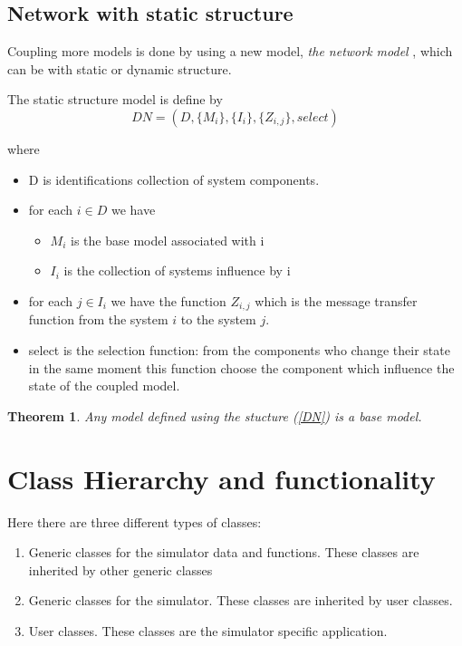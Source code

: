 \documentclass[a4paper,oneside,notitlepage]{article}
\newtheorem{theorem}{Theorem}
\begin{document}
\subsection{Network with static structure}

Coupling more models is done by using a new model, \textit{the network model}%
, which can be with static or dynamic structure.

The static structure model is define by%
\begin{equation}
DN=(D,\{M_{i}\},\{I_{i}\},\{Z_{i,j}\},select)  \label{DN}
\end{equation}

where

\begin{itemize}
\item D is identifications collection of system components.

\item for each $i\in D$ we have

\begin{itemize}
\item $M_{i}$ is the base model associated with i

\item $I_{i}$ is the collection of systems influence by i
\end{itemize}

\item for each $j\in I_{i}$ we have the function $Z_{i,j}$ which is the
message transfer function from the system \thinspace $i$ to the system $j$.

\item select is the selection function: from the components who change their
state in the same moment this function choose the component which influence
the state of the coupled model.
\end{itemize}

\begin{theorem}
Any model defined using the stucture (\ref{DN}) is a base model.
\end{theorem}

\section{Class Hierarchy and functionality}

Here there are three different types of classes:

\begin{enumerate}
\item Generic classes for the simulator data and functions. These classes
are inherited by other generic classes

\item Generic classes for the simulator. These classes are inherited by user
classes.

\item User classes. These classes are the simulator specific application.
\end{enumerate}
\end{document}
